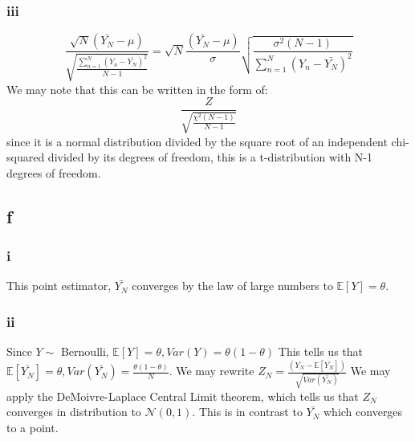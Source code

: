 \documentclass[10pt,letterpaper]{paper}
\newcommand*{\ex}{\mathbb{E}}
\begin{document}
\subsubsection*{iii}
$$\frac{\sqrt{ N} ( \bar{Y_N} - \mu )}{\sqrt{ \frac{\sum_{n=1}^N(Y_n - \bar{Y_N})^2}{N-1}}} = \sqrt{N} \frac{(\bar{Y_N} - \mu)}{\sigma} \sqrt{ \frac{\sigma^2 (N-1)}{\sum_{n=1}^N(Y_n -\bar{Y_N})^2} }$$
We may note that this can be written in the form of:
$$\frac{Z}{\sqrt{ \frac{\chi^2(N-1)}{N-1}}}$$
since it is a normal distribution divided by the square root of an independent
chi-squared divided by its degrees of freedom, this is a t-distribution with N-1
degrees of freedom.

\subsection*{f}

\subsubsection*{i}

This point estimator, $\bar{Y_N}$ converges by the law of large numbers to
$\mathbb{E}[Y] = \theta$.

\subsubsection*{ii}

Since $Y \sim $ Bernoulli, $\ex [Y] = \theta, Var(Y) = \theta(1-\theta)$ This tells us that
$\ex [\bar{Y_N}] = \theta, Var(\bar{Y_N}) = \frac{\theta(1-\theta)}{N}$. We may rewrite $Z_N =
\frac{(\bar{Y_N} - \ex [\bar{Y_N}])}{\sqrt{Var(\bar{Y_N})}}$ We may apply the
DeMoivre-Laplace Central Limit theorem, which tells us that $Z_N$ converges in
distribution to $\mathcal{N}(0,1)$. This is in contrast to $\bar{Y_N}$ which
converges to a point.
\end{document}
